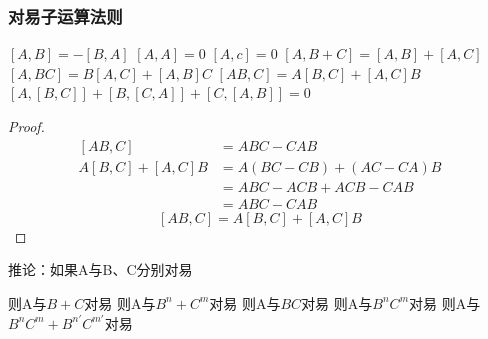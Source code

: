 \begin{frame} 
    \frametitle{对易子运算法则}
    \begin{enumerate}
        \Item  $[A,B]=-[B,A]$
        \Item  $[A,A]=0$
        \Item  $[A,c]=0$
        \Item  $[A,B+C]=[A,B]+[A,C]$
        \Item  $[A,BC]=B[A,C]+[A,B]C$
        \Item  $[AB,C]=A[B,C]+[A,C]B$
        \Item  $[A,[B,C]] + [B,[C,A]] + [C,[A,B]] =0$
    \end{enumerate}
\end{frame} 
\begin{frame}
    \begin{proof}{}   
        \begin{equation*}
            \begin{split} 
            [AB,C]&=ABC-CAB \\
            A[B,C]+[A,C]B&=A(BC-CB)+(AC-CA)B\\
            &=ABC-ACB+ACB-CAB\\
            &=ABC-CAB
            \end{split}  
        \end{equation*}  
        $$ [AB,C]=A[B,C]+[A,C]B $$
    \end{proof}
\end{frame} 

\begin{frame} 
    \begin{tcolorbox2}{推论：如果A与B、C分别对易}
        \begin{itemize}
            \Item 则A与$B+C$对易
            \Item 则A与$B^n+C^m$对易
            \Item 则A与$BC$对易
            \Item 则A与$B^nC^m$对易
            \Item 则A与$B^nC^m+B^{n'}C^{m'}$对易
        \end{itemize}
    \end{tcolorbox2}
\end{frame} 

